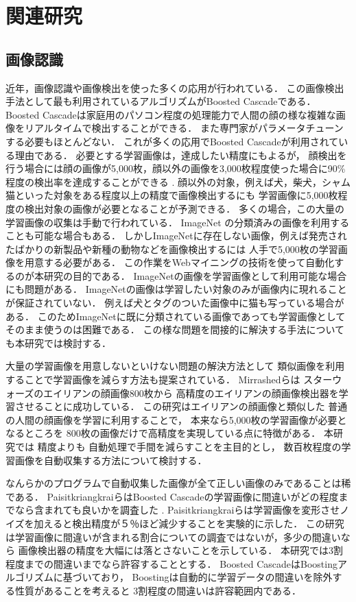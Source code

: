 \chapter{関連研究}
\label{sec:related}

\section{画像認識}

近年，画像認識や画像検出を使った多くの応用が行われている．
この画像検出手法として最も利用されているアルゴリズムがBoosted Cascade\cite{Viola01rapidobject}である．
Boosted Cascadeは家庭用のパソコン程度の処理能力で人間の顔の様な複雑な画像をリアルタイムで検出することができる．
また専門家がパラメータチューンする必要もほとんどない．
これが多くの応用でBoosted Cascadeが利用されている理由である．
必要とする学習画像は，達成したい精度にもよるが，
顔検出を行う場合には顔の画像が5,000枚，顔以外の画像を3,000枚程度使った場合に90\%程度の検出率を達成することができる
\cite{Lienhart03empiricalanalysis}
.
顔以外の対象，例えば犬，柴犬，シャム猫といった対象をある程度以上の精度で画像検出するにも
学習画像に5,000枚程度の検出対象の画像が必要となることが予測できる．
多くの場合，この大量の学習画像の収集は手動で行われている．
ImageNet\cite{imagenet}
の分類済みの画像を利用することも可能な場合もある．
しかしImageNetに存在しない画像，例えば発売されたばかりの新製品や新種の動物などを画像検出するには
人手で5,000枚の学習画像を用意する必要がある．
この作業をWebマイニングの技術を使って自動化するのが本研究の目的である．
ImageNetの画像を学習画像として利用可能な場合にも問題がある．
ImageNetの画像は学習したい対象のみが画像内に現れることが保証されていない．
例えば犬とタグのついた画像中に猫も写っている場合がある．
このためImageNetに既に分類されている画像であっても学習画像としてそのまま使うのは困難である．
この様な問題を間接的に解決する手法についても本研究では検討する．

大量の学習画像を用意しないといけない問題の解決方法として
類似画像を利用することで学習画像を減らす方法も提案されている．
Mirrashed\cite{Mirrashed_2013_ICCV}らは
スターウォーズのエイリアンの顔画像800枚から
高精度のエイリアンの顔画像検出器を学習させることに成功している．
この研究はエイリアンの顔画像と類似した
普通の人間の顔画像を学習に利用することで，
本来なら5,000枚の学習画像が必要となるところを
800枚の画像だけで高精度を実現している点に特徴がある．
本研究では
精度よりも
自動処理で手間を減らすことを主目的とし，
数百枚程度の学習画像を自動収集する方法について検討する．

なんらかのプログラムで自動収集した画像が全て正しい画像のみであることは稀である．
PaisitkriangkraiらはBoosted Cascadeの学習画像に間違いがどの程度までなら含まれても良いかを調査した
\cite{DBLP:journals/corr/abs-1009-5758}
.
Paisitkriangkraiらは学習画像を変形させノイズを加えると検出精度が５％ほど減少することを実験的に示した．
この研究は学習画像に間違いが含まれる割合についての調査ではないが，多少の間違いなら
画像検出器の精度を大幅には落とさないことを示している．
本研究では3割程度までの間違いまでなら許容することとする．
Boosted CascadeはBoostingアルゴリズムに基づいており，
Boostingは自動的に学習データの間違いを除外する性質があることを考えると
3割程度の間違いは許容範囲内である．


